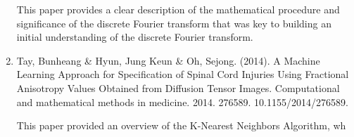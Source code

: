 \documentclass{article}
\begin{document}
\begin{enumerate}
This paper provides a clear description of the mathematical procedure and significance of the discrete Fourier transform that was key to building an initial understanding of the discrete Fourier transform.

\item Tay, Bunheang & Hyun, Jung Keun & Oh, Sejong. (2014). A Machine Learning Approach for Specification of Spinal Cord Injuries Using Fractional Anisotropy Values Obtained from Diffusion Tensor Images. Computational and mathematical methods in medicine. 2014. 276589. 10.1155/2014/276589. 

This paper provided an overview of the K-Nearest Neighbors Algorithm, wh


\end{enumerate}
\end{document}
